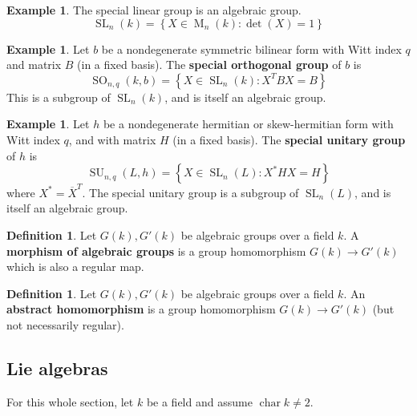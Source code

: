 \documentclass[12pt]{article}
\theoremstyle{definition}
\newtheorem{definition}[theorem]{Definition}
\newtheorem{example}[theorem]{Example}
\numberwithin{theorem}{subsection}
\newcommand{\lb}{\left\{}
\newcommand{\rb}{\right\}}
\newcommand{\tbf}{\textbf}
\newcommand{\ov}{\overline}
\DeclareMathOperator{\characteristic}{char}
\DeclareMathOperator{\M}{M}
\DeclareMathOperator{\SL}{SL}
\DeclareMathOperator{\SU}{SU}
\DeclareMathOperator{\SO}{SO}
\begin{document}
\begin{example}
The special linear group is an algebraic group.
\[
	\SL_n(k) = \lb X \in \M_n(k) : \det(X) = 1 \rb
\]
\end{example}

\begin{example}
Let $b$ be a nondegenerate symmetric bilinear form with Witt index $q$ and matrix $B$ (in a fixed basis). The \tbf{special orthogonal group} of $b$ is
\[
	\SO_{n,q}(k,b) = \lb X \in \SL_n(k) : X^T B X = B \rb
\]
This is a subgroup of $\SL_n(k)$, and is itself an algebraic group.
\end{example}

\begin{example}
Let $h$ be a nondegenerate hermitian or skew-hermitian form with Witt index $q$, and with matrix $H$ (in a fixed basis). The \tbf{special unitary group} of $h$ is
\[
	\SU_{n,q}(L,h) = \lb X \in \SL_n(L) : X^* H X = H \rb
\]
where $X^* = \ov X^T$. The special unitary group is a subgroup of $\SL_n(L)$, and is itself an algebraic group.
\end{example}

\begin{definition}
Let $G(k), G'(k)$ be algebraic groups over a field $k$. A \tbf{morphism of algebraic groups} is a group homomorphism $G(k) \to G'(k)$ which is also a regular map. 
\end{definition}

\begin{definition}
Let $G(k), G'(k)$ be algebraic groups over a field $k$. An \tbf{abstract homomorphism} is a group homomorphism $G(k) \to G'(k)$ (but not necessarily regular).
\end{definition}

\subsection{Lie algebras}
\label{Lie algebras}

For this whole section, let $k$ be a field and assume $\characteristic k \neq 2$.
\end{document}
